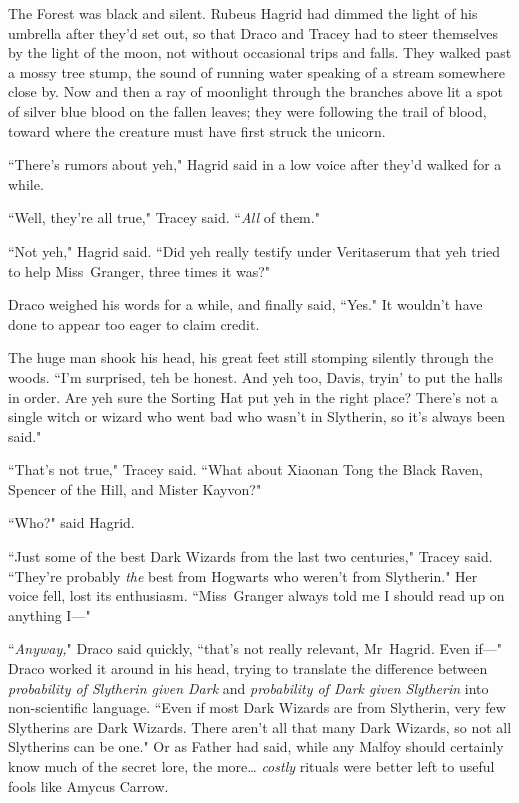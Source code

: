 The Forest was black and silent. Rubeus Hagrid had dimmed the light of his umbrella after they'd set out, so that Draco and Tracey had to steer themselves by the light of the moon, not without occasional trips and falls. They walked past a mossy tree stump, the sound of running water speaking of a stream somewhere close by. Now and then a ray of moonlight through the branches above lit a spot of silver blue blood on the fallen leaves; they were following the trail of blood, toward where the creature must have first struck the unicorn.

``There's rumors about yeh," Hagrid said in a low voice after they'd walked for a while.

``Well, they're all true," Tracey said. ``\emph{All} of them."

``Not yeh," Hagrid said. ``Did yeh really testify under Veritaserum that yeh tried to help Miss~Granger, three times it was?"

Draco weighed his words for a while, and finally said, ``Yes." It wouldn't have done to appear too eager to claim credit.

The huge man shook his head, his great feet still stomping silently through the woods. ``I'm surprised, teh be honest. And yeh too, Davis, tryin' to put the halls in order. Are yeh sure the Sorting Hat put yeh in the right place? There's not a single witch or wizard who went bad who wasn't in Slytherin, so it's always been said."

``That's not true," Tracey said. ``What about Xiaonan Tong the Black Raven, Spencer of the Hill, and Mister Kayvon?"

``Who?" said Hagrid.

``Just some of the best Dark Wizards from the last two centuries," Tracey said. ``They're probably \emph{the} best from Hogwarts who weren't from Slytherin." Her voice fell, lost its enthusiasm. ``Miss~Granger always told me I should read up on anything I—"

``\emph{Anyway,}" Draco said quickly, ``that's not really relevant, Mr~Hagrid. Even if—" Draco worked it around in his head, trying to translate the difference between \emph{probability of Slytherin given Dark} and \emph{probability of Dark given Slytherin} into non-scientific language. ``Even if most Dark Wizards are from Slytherin, very few Slytherins are Dark Wizards. There aren't all that many Dark Wizards, so not all Slytherins can be one." Or as Father had said, while any Malfoy should certainly know much of the secret lore, the more{\ldots} \emph{costly} rituals were better left to useful fools like Amycus Carrow.

